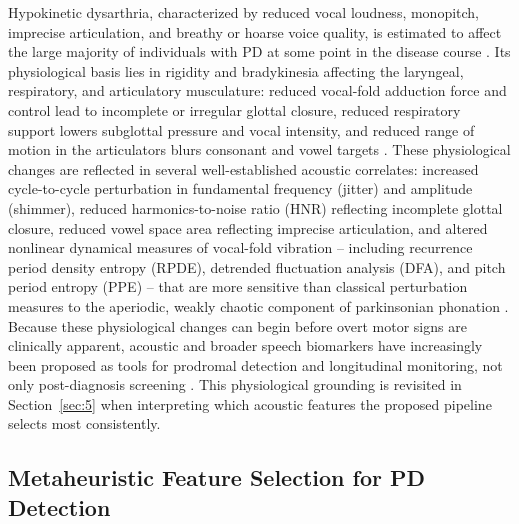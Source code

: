 Hypokinetic dysarthria, characterized by reduced vocal loudness,
monopitch, imprecise articulation, and breathy or hoarse voice quality, is
estimated to affect the large majority of individuals with PD at some
point in the disease course \cite{Ho:1999,Cao:2025}. Its physiological
basis lies in rigidity and bradykinesia affecting the laryngeal,
respiratory, and articulatory musculature: reduced vocal-fold adduction
force and control lead to incomplete or irregular glottal closure, reduced
respiratory support lowers subglottal pressure and vocal intensity, and
reduced range of motion in the articulators blurs consonant and vowel
targets \cite{Yang:2020}. These physiological changes are reflected in
several well-established acoustic correlates: increased cycle-to-cycle
perturbation in fundamental frequency (jitter) and amplitude (shimmer),
reduced harmonics-to-noise ratio (HNR) reflecting incomplete glottal
closure, reduced vowel space area reflecting imprecise articulation, and
altered nonlinear dynamical measures of vocal-fold vibration -- including
recurrence period density entropy (RPDE), detrended fluctuation analysis
(DFA), and pitch period entropy (PPE) -- that are more sensitive than
classical perturbation measures to the aperiodic, weakly chaotic component
of parkinsonian phonation \cite{Yang:2020}. Because these physiological
changes can begin before overt motor signs are clinically apparent,
acoustic and broader speech biomarkers have increasingly been proposed as
tools for prodromal detection and longitudinal monitoring, not only
post-diagnosis screening \cite{Rusz:2024,Cao:2025}. This physiological
grounding is revisited in Section~\ref{sec:5} when interpreting
which acoustic features the proposed pipeline selects most consistently.

\subsection{Metaheuristic Feature Selection for PD Detection}
\label{sec:2.3}

